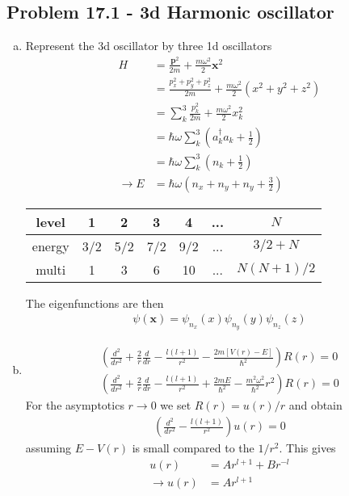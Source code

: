 \documentclass[../main.tex]{subfiles}
\begin{document}
\subsection{Problem 17.1 - 3d Harmonic oscillator}
\begin{enumerate}[(a)]
\item Represent the 3d oscillator by three 1d oscillators
\begin{align}
H&=\frac{\mathbf{p}^2}{2m}+\frac{m\omega^2}{2}\mathbf{x}^2\\
&=\frac{p_x^2+p_y^2+p_z^2}{2m}+\frac{m\omega^2}{2}(x^2+y^2+z^2)\\
&=\sum_k^3\frac{p_k^2}{2m}+\frac{m\omega^2}{2}x_k^2\\
&=\hbar\omega\sum_k^3\left(a_k^\dagger a_k+\frac{1}{2}\right)\\
&=\hbar\omega\sum_k^3\left(n_k+\frac{1}{2}\right)\\
\rightarrow E&=\hbar\omega\left(n_x+n_y+n_y+\frac{3}{2}\right)
\end{align}
\begin{center}
\begin{tabular}{|c|c|c|c|c|c|c|}
\hline 
level & 1 & 2 & 3 & 4 &... & $N$ \\ 
\hline\hline
energy & 3/2 & 5/2 & 7/2 & 9/2 &... & $3/2+N$ \\ 
\hline 
multi & 1 & 3 & 6 & 10 &... & $N(N+1)/2$ \\ 
\hline 
\end{tabular} 
\end{center}
The eigenfunctions are then
\begin{align}
\psi(\mathbf{x})=\psi_{n_x}(x)\psi_{n_y}(y)\psi_{n_z}(z)
\end{align}

\item
\begin{align}
\left(\frac{d^2}{dr^2}+\frac{2}{r}\frac{d}{dr}-\frac{l(l+1)}{r^2}-\frac{2m[V(r)-E]}{\hbar^2}\right)R(r)=0\\
\left(\frac{d^2}{dr^2}+\frac{2}{r}\frac{d}{dr}-\frac{l(l+1)}{r^2}+\frac{2mE}{\hbar^2}-\frac{m^2\omega^2}{\hbar^2}r^2\right)R(r)=0
\end{align}
For the asymptotics $r\rightarrow0$ we set $R(r)=u(r)/r$ and obtain
\begin{align}
\left(\frac{d^2}{dr^2}-\frac{l(l+1)}{r^2}\right)u(r)=0
\end{align}
assuming $E-V(r)$ is small compared to the $1/r^2$. This gives 
\begin{align}
u(r)&=Ar^{l+1}+Br^{-l}\\
\rightarrow u(r)&=Ar^{l+1}
\end{align}


\end{enumerate}
\end{document}
